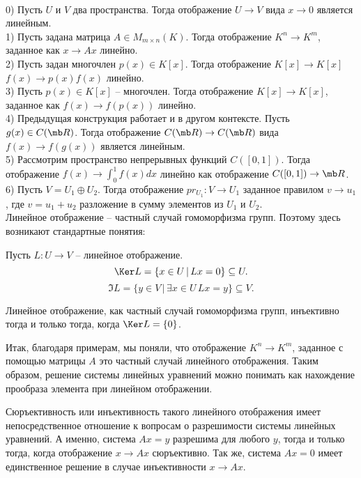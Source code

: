 \exm\\
0) Пусть $U$ и $V$ два пространства. Тогда отображение $U \to V$ вида $x \to 0$ является линейным.\\
1) Пусть задана матрица $A \in M_{m\times n}(K)$. Тогда отображение $K^n \to K^m$, заданное как $x \to Ax$ линейно.\\
2) Пусть задан многочлен $p(x) \in K[x]$. Тогда отображение $K[x] \to K[x]$ $f(x)\to p(x)f(x)$ линейно.\\
3) Пусть $p(x) \in K[x]$ -- многочлен. Тогда отображение $K[x] \to K[x]$, заданное как  $f(x)\to f(p(x))$ линейно.\\
4) Предыдущая конструкция работает и в другом контексте. Пусть $g(x)\in C(\mb R)$. Тогда отображение $C(\mb R)\to C(\mb R)$ вида $f(x)\to f(g(x))$ является линейным.\\
5) Рассмотрим пространство непрерывных функций $C([0,1])$. Тогда отображение $f(x) \to \int_{0}^1 f(x)dx$ линейно  как отображение $C([0,1])\to \mb R$.\\
6) Пусть $V=U_1\oplus U_2$. Тогда отображение $pr_{U_1} \colon V \to U_1$ заданное правилом $v \to u_1$, где $v=u_1+u_2$ разложение в сумму элементов из  $U_1$ и $U_2$.\\


Линейное отображение -- частный случай гомоморфизма групп. Поэтому здесь возникают стандартные понятия:






 Пусть $L\colon U \to V$ -- линейное отображение. 
$$\Ker L=\{x\in U\,|\, Lx=0\}\subseteq U.$$
$$\Im L=\{y\in V\,|\, \exists x\in U\, Lx=y\}\subseteq V.$$
\edfn

\rm Линейное отображение, как частный случай гомоморфизма групп, инъективно тогда и только тогда, когда $\Ker L=\{0\}$.
\erm

Итак, благодаря примерам, мы поняли, что отображение $K^n \to K^m$, заданное с помощью матрицы $A$ это частный случай линейного отображения. Таким образом, решение системы линейных уравнений можно понимать как нахождение прообраза элемента при линейном отображении.

Сюръективность или инъективность такого линейного отображения имеет непосредственное отношение к вопросам о разрешимости системы линейных уравнений. А именно, система $Ax=y$ разрешима для любого $y$, тогда и только тогда, когда отображение $x\to Ax$ сюръективно. Так же, система $Ax=0$ имеет единственное решение в случае инъективности $x\to Ax$.

